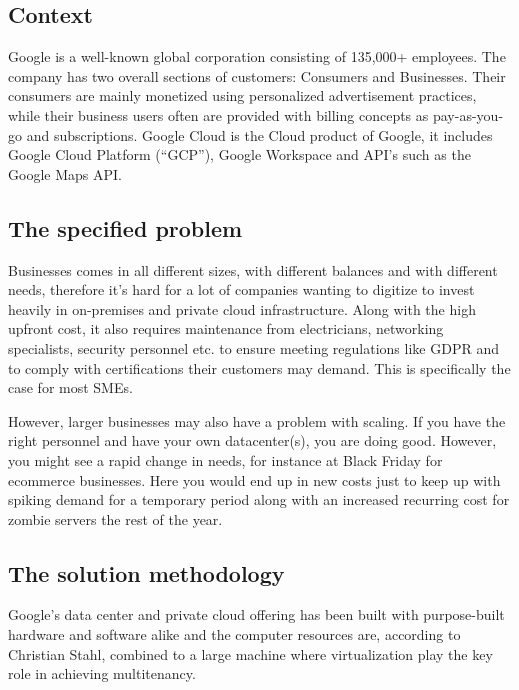 \documentclass[11pt]{article}
\begin{document}

\subsection*{Context}
Google is a well-known global corporation consisting of 135,000+ employees. The company has two overall sections of customers: Consumers and Businesses. Their consumers are mainly monetized using personalized advertisement practices, while their business users often are provided with billing concepts as pay-as-you-go and subscriptions. Google Cloud is the Cloud product of Google, it includes Google Cloud Platform (“GCP”), Google Workspace and API’s such as the Google Maps API.

\subsection*{The specified problem}
Businesses comes in all different sizes, with different balances and with different needs, therefore it’s hard for a lot of companies wanting to digitize to invest heavily in on-premises and private cloud infrastructure. Along with the high upfront cost, it also requires maintenance from electricians, networking specialists, security personnel etc. to ensure meeting regulations like GDPR and to comply with certifications their customers may demand. This is specifically the case for most SMEs.

However, larger businesses may also have a problem with scaling. If you have the right personnel and have your own datacenter(s), you are doing good. However, you might see a rapid change in needs, for instance at Black Friday for ecommerce businesses. Here you would end up in new costs just to keep up with spiking demand for a temporary period along with an increased recurring cost for zombie servers the rest of the year.

\subsection*{The solution methodology}
Google’s data center and private cloud offering has been built with purpose-built hardware and software alike and the computer resources are, according to Christian Stahl, combined to a large machine where virtualization play the key role in achieving multitenancy.
\end{document}
